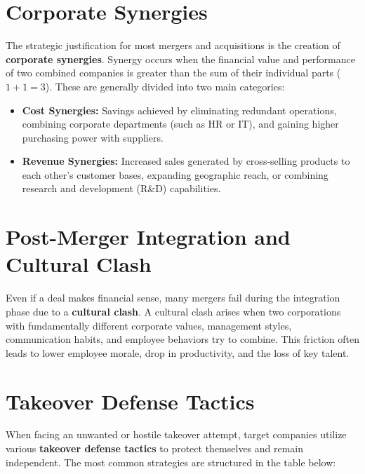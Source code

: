 \documentclass[12pt,a4paper]{report}
\begin{document}
\section{Corporate Synergies}
The strategic justification for most mergers and acquisitions is the creation of \textbf{corporate synergies}. Synergy occurs when the financial value and performance of two combined companies is greater than the sum of their individual parts ($1 + 1 = 3$). These are generally divided into two main categories:
\begin{itemize}
    \item \textbf{Cost Synergies:} Savings achieved by eliminating redundant operations, combining corporate departments (such as HR or IT), and gaining higher purchasing power with suppliers.
    \item \textbf{Revenue Synergies:} Increased sales generated by cross-selling products to each other's customer bases, expanding geographic reach, or combining research and development (R\&D) capabilities.
\end{itemize}

\section{Post-Merger Integration and Cultural Clash}
Even if a deal makes financial sense, many mergers fail during the integration phase due to a \textbf{cultural clash}. A cultural clash arises when two corporations with fundamentally different corporate values, management styles, communication habits, and employee behaviors try to combine. This friction often leads to lower employee morale, drop in productivity, and the loss of key talent.

\section{Takeover Defense Tactics}
When facing an unwanted or hostile takeover attempt, target companies utilize various \textbf{takeover defense tactics} to protect themselves and remain independent. The most common strategies are structured in the table below:
\end{document}
